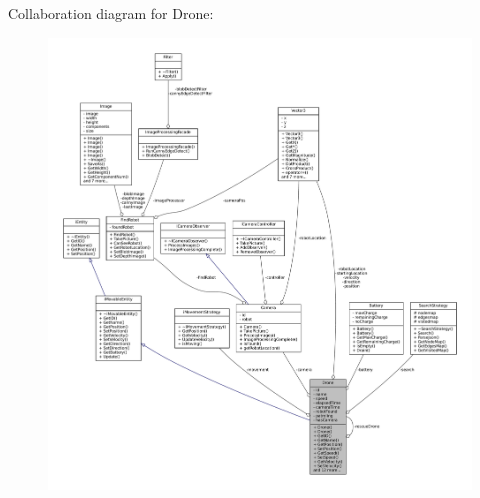 Collaboration diagram for Drone\+:\nopagebreak
\begin{figure}[H]
\begin{center}
\leavevmode
\includegraphics[width=350pt]{classDrone__coll__graph}
\end{center}
\end{figure}
